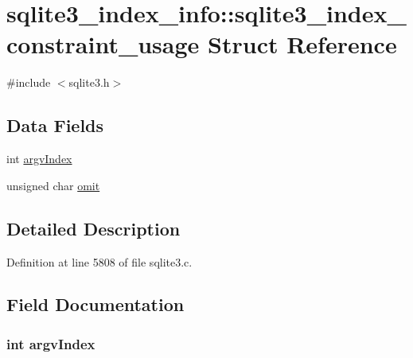 \hypertarget{structsqlite3__index__info_1_1sqlite3__index__constraint__usage}{}\section{sqlite3\+\_\+index\+\_\+info\+:\+:sqlite3\+\_\+index\+\_\+constraint\+\_\+usage Struct Reference}
\label{structsqlite3__index__info_1_1sqlite3__index__constraint__usage}


{\ttfamily \#include $<$sqlite3.\+h$>$}

\subsection*{Data Fields}
\begin{DoxyCompactItemize}
\item 
int \hyperlink{structsqlite3__index__info_1_1sqlite3__index__constraint__usage_a71527e0209c0464b952e54100f515e4e}{argv\+Index}
\item 
unsigned char \hyperlink{structsqlite3__index__info_1_1sqlite3__index__constraint__usage_ad5b08c06721b109a4a619a7ce0a1a3e2}{omit}
\end{DoxyCompactItemize}


\subsection{Detailed Description}


Definition at line 5808 of file sqlite3.\+c.



\subsection{Field Documentation}
\hypertarget{structsqlite3__index__info_1_1sqlite3__index__constraint__usage_a71527e0209c0464b952e54100f515e4e}{}
\subsubsection[{argv\+Index}]{\setlength{\rightskip}{0pt plus 5cm}int argv\+Index}\label{structsqlite3__index__info_1_1sqlite3__index__constraint__usage_a71527e0209c0464b952e54100f515e4e}


